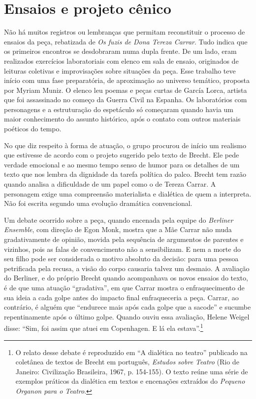 \section{Ensaios e projeto cênico}

Não há muitos registros ou lembranças que permitam reconstituir o
processo de ensaios da peça, rebatizada de \textit{Os fuzis de Dona Tereza
Carrar}. Tudo indica que os primeiros encontros se desdobraram numa
dupla frente. De um lado, eram realizados exercícios laboratoriais com
elenco em sala de ensaio, originados de leituras coletivas e
improvisações sobre situações da peça. Esse trabalho teve início com uma
fase preparatória, de aproximação ao universo temático, proposta por
Myriam Muniz. O elenco leu poemas e peças curtas de García Lorca,
artista que foi assassinado no começo da Guerra Civil na Espanha. Os
laboratórios com personagens e a estruturação do espetáculo só começaram
quando havia um maior conhecimento do assunto histórico, após o contato
com outros materiais poéticos do tempo.

No que diz respeito à forma de atuação, o grupo procurou de início um
realismo que estivesse de acordo com o projeto sugerido pelo texto de
Brecht. Ele pede verdade emocional e ao mesmo tempo senso de humor para
os detalhes de um texto que nos lembra da dignidade da tarefa política
do palco. Brecht tem razão quando analisa a dificuldade de um papel como
o de Tereza Carrar. A personagem exige uma compreensão materialista e
dialética de quem a interpreta. Não foi escrita segundo uma evolução
dramática convencional.

Um debate ocorrido sobre a peça, quando encenada pela equipe do
\textit{Berliner Ensemble}, com direção de Egon Monk, mostra que a Mãe
Carrar não muda gradativamente de opinião, movida pela sequência de
argumentos de parentes e vizinhos, pois as falas de convencimento não a
sensibilizam. E nem a morte do seu filho pode ser considerada o motivo
absoluto da decisão: para uma pessoa petrificada pela recusa, a visão do
corpo causaria talvez um desmaio. A avaliação do Berliner, e do próprio
Brecht quando acompanhava os novos ensaios do texto, é de que uma
atuação “gradativa”, em que Carrar mostra o enfraquecimento de sua ideia
a cada golpe antes do impacto final enfraqueceria a peça. Carrar, ao
contrário, é alguém que “endurece mais após cada golpe que a sacode” e
sucumbe repentinamente após o último golpe. Quando ouviu essa avaliação,
Helene Weigel disse: “Sim, foi assim que atuei em Copenhagen. E lá ela
estava”.\footnote{O relato desse debate é reproduzido em “A dialética no
  teatro” publicado na coletânea de textos de Brecht em português,
  \textit{Estudos sobre Teatro} (Rio de Janeiro: Civilização Brasileira,
  1967, p. 154-155). O texto reúne uma série de exemplos práticos da
  dialética em textos e encenações extraídos do \textit{Pequeno Organon
  para o Teatro}.}

